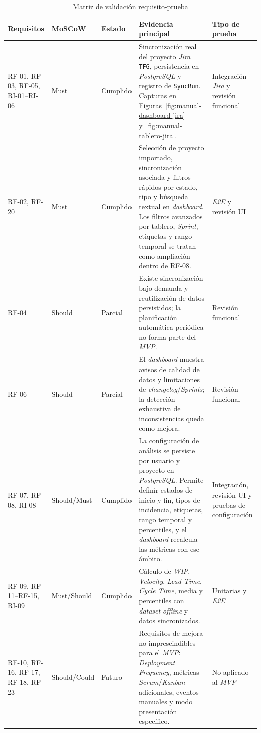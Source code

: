 {\renewcommand{\arraystretch}{1.22}\scriptsize
\begin{longtable}{p{1.65cm}p{1.55cm}p{1.65cm}p{5.35cm}p{2.45cm}}
\caption{Matriz de validación requisito-prueba}\label{tab:matriz-requisito-prueba}\\
\toprule
\textbf{Requisitos} & \textbf{MoSCoW} & \textbf{Estado} & \textbf{Evidencia principal} & \textbf{Tipo de prueba} \\
\midrule
RF-01, RF-03, RF-05, RI-01--RI-06 & Must & Cumplido & Sincronización real del proyecto \textit{Jira} \texttt{TFG}, persistencia en \textit{PostgreSQL} y registro de \texttt{SyncRun}. Capturas en Figuras~\ref{fig:manual-dashboard-jira} y~\ref{fig:manual-tablero-jira}. & Integración \textit{Jira} y revisión funcional \\
RF-02, RF-20 & Must & Cumplido & Selección de proyecto importado, sincronización asociada y filtros rápidos por estado, tipo y búsqueda textual en \textit{dashboard}. Los filtros avanzados por tablero, \textit{Sprint}, etiquetas y rango temporal se tratan como ampliación dentro de RF-08. & \textit{E2E} y revisión UI \\
RF-04 & Should & Parcial & Existe sincronización bajo demanda y reutilización de datos persistidos; la planificación automática periódica no forma parte del \textit{MVP}. & Revisión funcional \\
RF-06 & Should & Parcial & El \textit{dashboard} muestra avisos de calidad de datos y limitaciones de \textit{changelog}/\textit{Sprints}; la detección exhaustiva de inconsistencias queda como mejora. & Revisión funcional \\
RF-07, RF-08, RI-08 & Should/Must & Cumplido & La configuración de análisis se persiste por usuario y proyecto en \textit{PostgreSQL}. Permite definir estados de inicio y fin, tipos de incidencia, etiquetas, rango temporal y percentiles, y el \textit{dashboard} recalcula las métricas con ese ámbito. & Integración, revisión UI y pruebas de configuración \\
RF-09, RF-11--RF-15, RI-09 & Must/Should & Cumplido & Cálculo de \textit{WIP}, \textit{Velocity}, \textit{Lead Time}, \textit{Cycle Time}, media y percentiles con \textit{dataset} \textit{offline} y datos sincronizados. & Unitarias y \textit{E2E} \\
RF-10, RF-16, RF-17, RF-18, RF-23 & Should/Could & Futuro & Requisitos de mejora no imprescindibles para el \textit{MVP}: \textit{Deployment Frequency}, métricas \textit{Scrum}/\textit{Kanban} adicionales, eventos manuales y modo presentación específico. & No aplicado al \textit{MVP} \\

\end{longtable}}
